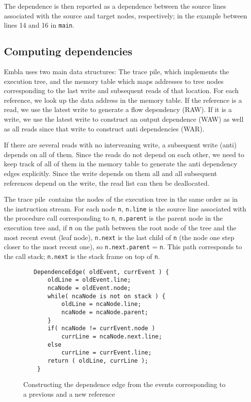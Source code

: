 \documentclass{acm_proc_article-sp}
\begin{document}
The dependence is then reported as a dependence between the source lines
associated with the source and target nodes, respectively; in the example
between lines 14 and 16 in {\tt main}.

\newcommand{\tracepile}{trace pile}

\subsection{Computing dependencies}

Embla uses two main data structures: The \tracepile, which implements 
the execution tree, and the memory table which maps addresses to tree
nodes corresponding to the last write and subsequent reads of that
location. For each reference, we look up the data address in the memory 
table. If the reference is a read, we use the latest write to generate
a flow dependency (RAW). If it is a write, we use the latest write to 
construct an output dependence (WAW) as well as all reads since that 
write to construct anti dependencies (WAR).

If there are several reads with no interveaning write, a subsequent write
(anti) depends on all of them. Since the reads do not depend on each other,
we need to keep track of all of them in the memory table to generate the
anti dependency edges explicitly. Since the write depends on them all and
all subsequent references depend on the write, the read list can then be
deallocated.

The \tracepile\ contains the nodes of the execution tree in the same order
as in the instruction stream. For each node {\tt n}, {\tt n.line} is the 
source line associated with the procedure call 
corresponding to {\tt n}, {\tt n.parent} is the parent node in the execution tree 
and, if {\tt n} on the path between the root node of the tree and the most recent 
event (leaf node), {\tt n.next} is the last child of {\tt n} (the node one step 
closer to the most recent one), so {\tt n.next.parent} = {\tt n}. This
path corresponds to the call stack; {\tt n.next} is the stack frame on
top of {\tt n}.

\begin{figure}
\small
\hrulefill
\begin{verbatim}
   DependenceEdge( oldEvent, currEvent ) {
       oldLine = oldEvent.line;
       ncaNode = oldEvent.node;
       while( ncaNode is not on stack ) {
           oldLine = ncaNode.line;
           ncaNode = ncaNode.parent;
       }
       if( ncaNode != currEvent.node )
           currLine = ncaNode.next.line;
       else
           currLine = currEvent.line;
       return ( oldLine, currLine );
    }
\end{verbatim}
\hrulefill
\caption{Constructing the dependence edge from the events corresponding
to a previous and a new reference}
\label{fdepedge}
\end{figure}    
\end{document}
